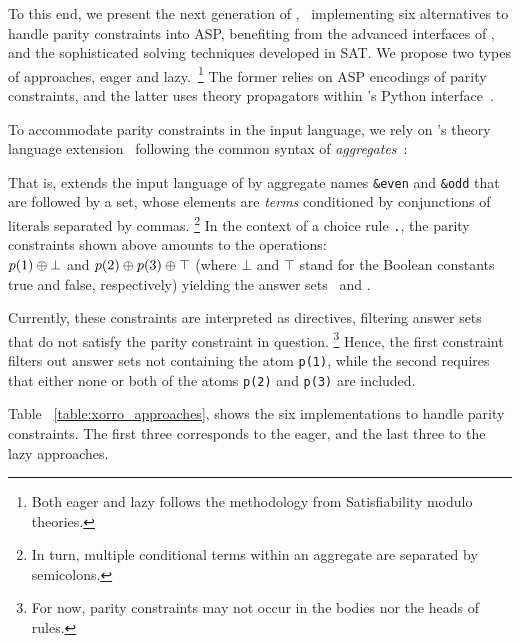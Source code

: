\documentclass[letterpaper]{article} %
\begin{document}
 To this end, we present the next generation of \xorro,~\cite{evjakasc19a}
 implementing six alternatives to handle parity constraints into ASP,
 benefiting from the advanced interfaces of \clingo{},
 and the sophisticated solving techniques developed in SAT.
 We propose two types of approaches, eager and lazy.~\footnote{Both eager and lazy follows the methodology from Satisfiability modulo theories.}
 The former relies on ASP encodings of parity constraints, and the latter uses theory propagators within \clingo{}’s Python interface~\cite{DBLP:conf/iclp/GebserKKOSW16}.
 
 To accommodate parity constraints in the input language,
 we rely on \clingo’s theory language extension~\cite{DBLP:conf/iclp/GebserKKOSW16}
 following the common syntax of \emph{aggregates}~\cite{DBLP:journals/tplp/GebserHKLS15}:
 
 That is, \xorro{} extends the input language of \clingo{} by
 aggregate names \texttt{\&even} and \texttt{\&odd} that are followed
 by a set, whose elements are \emph{terms} conditioned by
 conjunctions of literals separated by commas.%
 \footnote{In turn, multiple conditional terms within an aggregate are
 	separated by semicolons.}
 In the context of a choice rule \texttt{.}, the parity constraints shown above
 amounts to the \XOR{} operations: \\
 $p(1) \oplus \bot$ and $p(2) \oplus p(3) \oplus \top$
 (where $\bot$ and $\top$ stand for the Boolean constants true and false, respectively)
 yielding the answer sets~\texttt{} and \texttt{}.
 
 
 Currently, these constraints are interpreted as directives,
 filtering answer sets that do not satisfy the parity constraint in question.
 \footnote{For now, parity constraints may not occur in the bodies nor the heads of rules.}
 Hence, the first
 constraint filters out answer sets not containing the atom
 \texttt{p(1)}, while the second requires that either none or both of
 the atoms \texttt{p(2)} and \texttt{p(3)} are included.
 
 Table~ \ref{table:xorro_approaches}, shows the six implementations to handle parity constraints.
 The first three corresponds to the eager, and the last three to the lazy approaches. 
 
\end{document}
